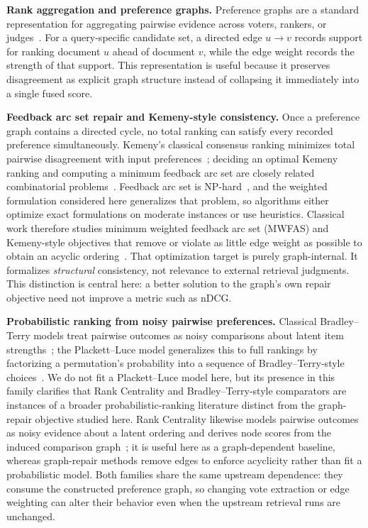 \documentclass[manuscript,anonymous,review]{acmart}
\begin{document}
\textbf{Rank aggregation and preference graphs.} Preference graphs are a
standard representation for aggregating pairwise evidence across voters,
rankers, or judges~\cite{dwork2001rank,ailon2008aggregating,negahban2017rankcentrality}.
For a query-specific candidate set, a directed edge $u \rightarrow v$ records
support for ranking document $u$ ahead of document $v$, while the edge weight
records the strength of that support. This representation is useful because it
preserves disagreement as explicit graph structure instead of collapsing it
immediately into a single fused score.

\textbf{Feedback arc set repair and Kemeny-style consistency.} Once a
preference graph contains a directed cycle, no total ranking can satisfy every
recorded preference simultaneously. Kemeny's classical consensus ranking
minimizes total pairwise disagreement with input preferences~\cite{kemeny1959mathematics};
deciding an optimal Kemeny ranking and computing a minimum feedback arc set
are closely related combinatorial problems~\cite{dwork2001rank,ailon2008aggregating}.
Feedback arc set is NP-hard~\cite{karp1972reducibility}, and the weighted
formulation considered here generalizes that problem, so
algorithms either optimize exact formulations on moderate instances or use
heuristics. Classical work therefore studies minimum weighted feedback arc set
(MWFAS) and Kemeny-style objectives that remove or violate as little edge
weight as possible to obtain an acyclic
ordering~\cite{dwork2001rank,ailon2008aggregating,kenyon2007fewerrors,fagin2003comparing}.
That optimization target is purely graph-internal. It formalizes
\emph{structural} consistency, not relevance to external retrieval judgments.
This distinction is central here: a better solution to the graph's own repair
objective need not improve a metric such as nDCG.

\textbf{Probabilistic ranking from noisy pairwise preferences.} Classical
Bradley--Terry models treat pairwise outcomes as noisy comparisons about latent
item strengths~\cite{bradley1952rank}; the Plackett--Luce model generalizes
this to full rankings by factorizing a permutation's probability into a
sequence of Bradley--Terry-style choices~\cite{plackett1975analysis,luce1959individual}.
We do not fit a Plackett--Luce model here, but its presence in this family
clarifies that Rank Centrality and Bradley--Terry-style comparators are
instances of a broader probabilistic-ranking literature distinct from the
graph-repair objective studied here. Rank Centrality likewise models pairwise
outcomes as noisy evidence about a latent ordering and derives node scores from
the induced comparison graph~\cite{negahban2017rankcentrality}; it is useful
here as a graph-dependent baseline, whereas graph-repair methods remove edges
to enforce acyclicity rather than fit a probabilistic model. Both families
share the same upstream dependence: they consume the constructed preference
graph, so changing vote extraction or edge weighting can alter their behavior
even when the upstream retrieval runs are unchanged.
\end{document}
